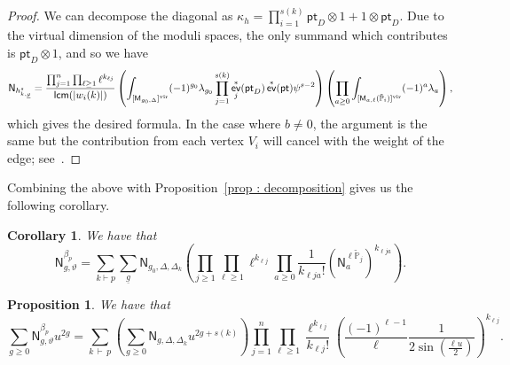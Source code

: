 \documentclass[11pt]{amsart}
\numberwithin{equation}{section}
\theoremstyle{plain}
\newtheorem{corollary}[theorem]{Corollary}
\newtheorem{proposition}[theorem]{Proposition}
\theoremstyle{remark}
\theoremstyle{definition}
\DeclareMathOperator{\ev}{\mathsf{ev}}
\newcommand{\PP}{\mathbb{P}}
\newcommand{\vir}{\text{\rm vir}}
\newcommand{\pt}{{\mathsf{pt}}}
\begin{document}
\begin{proof}
We can decompose the diagonal as $\kappa_h = \prod_{i=1}^{s(k)}\pt_{D} \otimes 1 + 1 \otimes \pt_{D}$. Due to the virtual dimension of the moduli spaces, the only summand which contributes is $\pt_{D} \otimes 1$, and so we have $$\mathsf{N}_{h_{k,\underline{g}}^s} = \frac{\prod_{j=1}^{n}\prod_{\ell \geq 1}\ell^{k_{\ell j}}}{\mathsf{lcm}(|w_i(k)|)}\left(\int_{[\mathsf{M}_{g_0,\Delta}]^{\vir}} (-1)^{g_0} \lambda_{g_0} \prod_{j=1}^{s(k)} \ev_{j}^{*}(\mathsf{pt}_{D})\ev^* (\mathsf{pt})\psi^{s-2}\right) \left(\prod_{a \geq 0} \int_{[\mathsf{M}_{a,\ell}(\tilde{\PP}_i)]^{\vir}}(-1)^a \lambda_{a}\right),$$ which gives the desired formula. In the case where $b\neq 0$, the argument is the same but the contribution from each vertex $V_i$ will cancel with the weight of the edge; see~\cite[Lemma 15]{bousseau2018tropical}.
\end{proof}

Combining the above with Proposition~\ref{prop : decomposition} gives us the following corollary.

\begin{corollary}
We have that 
  \begin{equation*}
        \mathsf{N}_{g,\vartheta}^{\beta_p} = \sum_{k \vdash p} \sum_{\underline{g}} \mathsf{N}_{g_0,\Delta, \Delta_k} \left(\prod_{j \geq 1} \prod_{\ell \geq 1} \ell^{k_{\ell j}}\prod_{a \geq 0} \frac{1}{k_{\ell j a}!}\left(\mathsf{N}_{a}^{\ell \tilde{\PP}_j}\right)^{k_{\ell j a}}\right). 
    \end{equation*}
\end{corollary}

\begin{proposition}\label{Proposition : GW to toric}
  We have that 
    \begin{equation}
        \sum_{g \geq 0 } \mathsf{N}_{g,\vartheta}^{\beta_p} u^{2g} = \sum_{k \, \vdash \, p} \left(\sum_{g \geq 0} \mathsf{N}_{g,\Delta, \Delta_k}u^{2g + s(k)} \right)\prod_{j=1}^n \prod_{\ell \geq 1} \frac{\ell^{k_{\ell j}}}{k_{\ell j}!} \left(\frac{(-1)^{\ell - 1}}{\ell} \frac{1}{2 \sin\left(\frac{\ell u}{2}\right)}\right)^{k_{\ell j}}.
    \end{equation}
\end{proposition}
\end{document}
